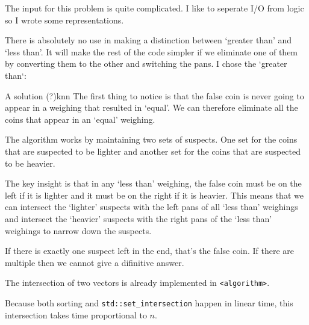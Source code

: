 \documentclass{writeup}
\begin{document}
\begin{solutions}
  The input for this problem is quite complicated.
  I like to seperate I/O from logic so I wrote some representations.

  
  There is absolutely no use in making a distinction between `greater than' and `less than'.
  It will make the rest of the code simpler if we eliminate one of them by converting them to the other and switching the pans.
  I chose the `greater than`:


  \begin{solution}{A solution (?)}{kn}{n}
    The first thing to notice is that the false coin is never going to appear in a weighing that resulted in `equal'.
    We can therefore eliminate all the coins that appear in an `equal' weighing.


    The algorithm works by maintaining two sets of suspects.
    One set for the coins that are suspected to be lighter and another set for the coins that are suspected to be heavier.

    The key insight is that in any `less than' weighing, the false coin must be on the left if it is lighter and it must be on the right if it is heavier.
    This means that we can intersect the `lighter' suspects with the left pans of all `less than' weighings and intersect the `heavier' suspects with the right pans of the `less than'  weighings to narrow down the suspects.

    If there is exactly one suspect left in the end, that's the false coin.
    If there are multiple then we cannot give a difinitive answer.


    The intersection of two vectors is already implemented in \texttt{<algorithm>}.


    Because both sorting and \texttt{std::set_intersection} happen in linear time, this intersection takes time proportional to $n$.
  \end{solution}
\end{solutions}
\end{document}

